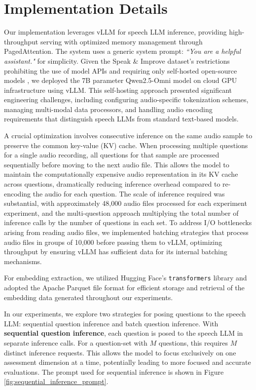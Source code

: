 \documentclass{report}
\begin{document}
\section{Implementation Details}
\label{sec:implementation_details}
Our implementation leverages vLLM \citep{kwon2023efficientmemorymanagementlarge} for speech LLM inference, providing high-throughput serving with optimized memory management through PagedAttention. The system uses a generic system prompt: \emph{``You are a helpful assistant."} for simplicity. Given the Speak \& Improve dataset's restrictions prohibiting the use of model APIs and requiring only self-hosted open-source models \citep{knill2024sandi}, we deployed the 7B parameter Qwen2.5-Omni model on cloud GPU infrastructure using vLLM. This self-hosting approach presented significant engineering challenges, including configuring audio-specific tokenization schemes, managing multi-modal data processors, and handling audio encoding requirements that distinguish speech LLMs from standard text-based models.

A crucial optimization involves consecutive inference on the same audio sample to preserve the common key-value (KV) cache. When processing multiple questions for a single audio recording, all questions for that sample are processed sequentially before moving to the next audio file. This allows the model to maintain the computationally expensive audio representation in its KV cache across questions, dramatically reducing inference overhead compared to re-encoding the audio for each question. The scale of inference required was substantial, with approximately 48,000 audio files processed for each experiment experiment, and the multi-question approach multiplying the total number of inference calls by the number of questions in each set. To address I/O bottlenecks arising from reading audio files, we implemented batching strategies that process audio files in groups of 10,000 before passing them to vLLM, optimizing throughput by ensuring vLLM has sufficient data for its internal batching mechanisms.

For embedding extraction, we utilized Hugging Face's \texttt{transformers} library \citep{wolf2020huggingfacestransformersstateoftheartnatural} and adopted the Apache Parquet file format \citep{apache_parquet} for efficient storage and retrieval of the embedding data generated throughout our experiments.

In our experiments, we explore two strategies for posing questions to the speech LLM: sequential question inference and batch question inference. With \textbf{sequential question inference}, each question is posed to the speech LLM in separate inference calls. For a question-set with $M$ questions, this requires $M$ distinct inference requests. This allows the model to focus exclusively on one assessment dimension at a time, potentially leading to more focused and accurate evaluations. The prompt used for sequential inference is shown in Figure \ref{fig:sequential_inference_prompt}.
\end{document}
